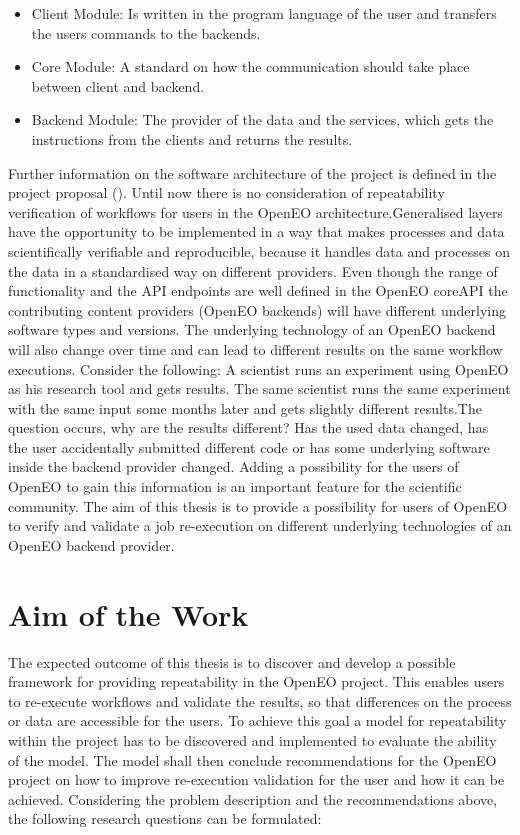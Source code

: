 \documentclass[draft,final]{vutinfth} %
\begin{document}
\begin{itemize}
	\item Client Module: Is written in the program language of the user and transfers the users commands to the backends.
	\item Core Module: A standard on how the communication should take place between client and backend.
	\item Backend Module: The provider of the data and the services, which gets the instructions from the clients and returns the results.
\end{itemize}   
Further information on the software architecture of the project is defined in the project proposal (\cite{openeo}). Until now there is no consideration of repeatability verification of workflows for users in the OpenEO architecture.Generalised layers have the opportunity to be implemented in a way that makes processes and data scientifically verifiable and reproducible, because it handles data and processes on the data in a standardised way on different providers. Even though the range of functionality and the API endpoints are well defined in the OpenEO coreAPI the contributing content providers (OpenEO backends) will have different underlying software types and versions. The underlying technology of an OpenEO backend will also change over time and can lead to different results on the same workflow executions. Consider the following: A scientist runs an experiment using OpenEO as his research tool and gets results. The same scientist runs the same experiment with the same input some months later and gets slightly different results.The question occurs, why are the results different? Has the used data changed, has the user accidentally submitted different code or has some underlying software inside the backend provider changed. Adding a possibility for the users of OpenEO to gain this information is an important
feature for the scientific community. The aim of this thesis is to provide a possibility for users
of OpenEO to verify and validate a job re-execution on different underlying technologies of an OpenEO backend provider.\cite{openeo}

\section{Aim of the Work}\label{Aim}

The expected outcome of this thesis is to discover and develop a possible framework for providing repeatability in the OpenEO project. This enables users to re-execute workflows and validate the results, so that differences on the process or data are accessible for the users. To achieve this goal a model for repeatability within the project has to be discovered and implemented to evaluate the ability of the model. The model shall then conclude recommendations for the OpenEO project on how to improve re-execution validation for the user and how it can be achieved. Considering the problem description and the recommendations above, the following research questions can be formulated:
\end{document}
